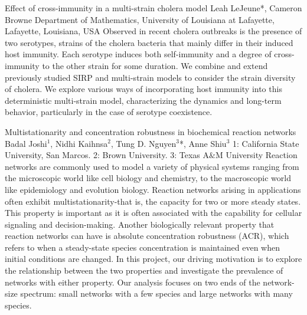 \vspace{1.5ex}
\abs
{Effect of cross-immunity in a multi-strain cholera model}
{Leah LeJeune{*}, Cameron Browne}
{Department of Mathematics, University of Louisiana at Lafayette, Lafayette, Louisiana, USA}
{Observed in recent cholera outbreaks is the presence of two serotypes, strains of the cholera bacteria that mainly differ in their induced host immunity. Each serotype induces both self-immunity and a degree of cross-immunity to the other strain for some duration. We combine and extend previously studied SIRP and multi-strain models to consider the strain diversity of cholera. We explore various ways of incorporating host immunity into this deterministic multi-strain model, characterizing the dynamics and long-term behavior, particularly in the case of serotype coexistence.}


\vspace{1.5ex}
\abs
{Multistationarity and concentration robustness in biochemical reaction networks}
{Badal Joshi$^{1}$, Nidhi Kaihnsa$^{2}$, Tung D. Nguyen$^{3}$*, Anne Shiu$^{3}$}
{1: California State University, San Marcos. 2: Brown University. 3: Texas A$\&$M University}
{Reaction networks are commonly used to model a variety of physical systems ranging from the microscopic world like cell biology and chemistry, to the macroscopic world like epidemiology and evolution biology. Reaction networks arising in applications often exhibit multistationarity-that is, the capacity for two or more steady states. This property is important as it is often associated with the capability for cellular signaling and decision-making. Another biologically relevant property that reaction networks can have is absolute concentration robustness (ACR), which refers to when a steady-state species concentration is maintained even when initial conditions are changed. In this project, our driving motivation is to explore the relationship between the two properties and investigate the prevalence of networks with either property. Our analysis focuses on two ends of the network-size spectrum: small networks with a few species and large networks with many species.}



